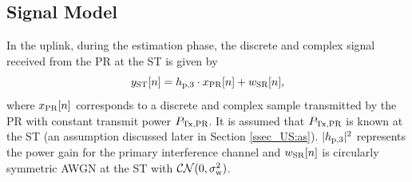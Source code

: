 
\subsection{Signal Model}
In the uplink, during the estimation phase, the discrete and complex signal received from the PR at the ST is given by
\begin{equation}
y_{\text{ST}}[n] = h_{\text{p,3}} \cdot x_{\text{PR}}[n] + w_{\text{SR}}[n],
\label{eq_US:sys_mod_st}
\end{equation}
where $x_{\text{PR}}[n]$ corresponds to a discrete and complex sample transmitted by the PR with constant transmit power $P_{\text{Tx,PR}}$. It is assumed that $P_{\text{Tx,PR}}$ is known at the ST (an assumption discussed later in Section \ref{ssec_US:as}). $|h_{\text{p,3}}|^2$ represents the power gain for the primary interference channel and $w_{\text{SR}}[n]$ is circularly symmetric AWGN at the ST with %
$\mathcal{CN}(0, \sigma^2_{\text{w}})$. %

